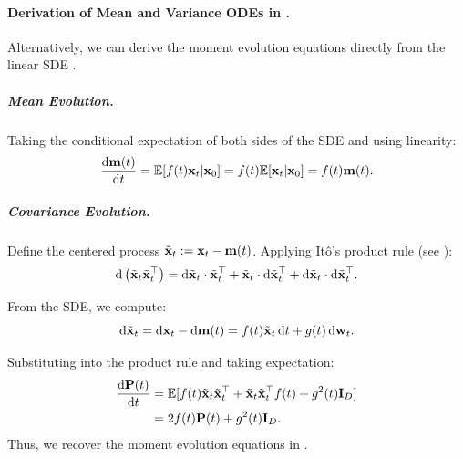 \paragraph{Derivation of Mean and Variance ODEs in .}
Alternatively, we can derive the moment evolution equations directly from the linear SDE . 


\subparagraph{Mean Evolution.}
Taking the conditional expectation of both sides of the SDE and using linearity:
\[
\frac{\mathop{}\!\mathrm{d} {\mathbf{m}}(t)}{\mathop{}\!\mathrm{d} t} = \mathbb{E}[f(t) {\mathbf{x}}_t|{\mathbf{x}}_0] = f(t) \mathbb{E}[{\mathbf{x}}_t|{\mathbf{x}}_0] = f(t) {\mathbf{m}}(t).
\]

\vspace{0.3cm}

\subparagraph{Covariance Evolution.}
Define the centered process $ \tilde{{\mathbf{x}}}_t := {\mathbf{x}}_t - {\mathbf{m}}(t) $. Applying It\^o's product rule (see ):
\[
\mathop{}\!\mathrm{d} \left( \tilde{{\mathbf{x}}}_t \tilde{{\mathbf{x}}}_t^\top \right)
= \mathop{}\!\mathrm{d} \tilde{{\mathbf{x}}}_t \cdot \tilde{{\mathbf{x}}}_t^\top 
+ \tilde{{\mathbf{x}}}_t \cdot \mathop{}\!\mathrm{d} \tilde{{\mathbf{x}}}_t^\top 
+ \mathop{}\!\mathrm{d} \tilde{{\mathbf{x}}}_t \cdot \mathop{}\!\mathrm{d} \tilde{{\mathbf{x}}}_t^\top.
\]

From the SDE, we compute:
\[
\mathop{}\!\mathrm{d} \tilde{{\mathbf{x}}}_t = \mathop{}\!\mathrm{d} {\mathbf{x}}_t - \mathop{}\!\mathrm{d} {\mathbf{m}}(t) = f(t) \tilde{{\mathbf{x}}}_t  \mathop{}\!\mathrm{d} t + g(t)  \mathop{}\!\mathrm{d} {\mathbf{w}}_t.
\]

Substituting into the product rule and taking expectation:
\begin{align*}
    \frac{\mathop{}\!\mathrm{d} {\mathbf{P}}(t)}{\mathop{}\!\mathrm{d} t}
    &= \mathbb{E}[f(t) \tilde{{\mathbf{x}}}_t \tilde{{\mathbf{x}}}_t^\top + \tilde{{\mathbf{x}}}_t \tilde{{\mathbf{x}}}_t^\top f(t) + g^2(t) {\mathbf{I}}_D] \\
    &= 2 f(t) {\mathbf{P}}(t) + g^2(t) {\mathbf{I}}_D.
\end{align*}
Thus, we recover the moment evolution equations in .







